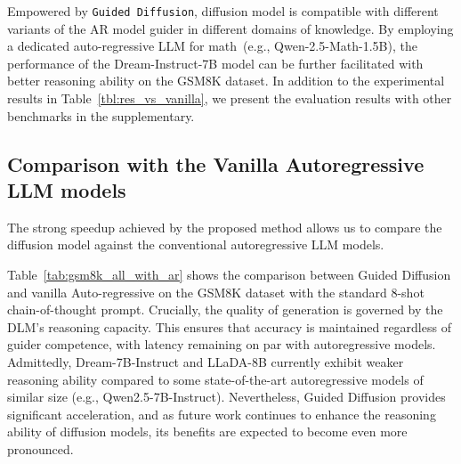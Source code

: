 Empowered by \texttt{Guided Diffusion}, diffusion model is compatible with different variants of the AR model guider in different domains of knowledge. By employing a dedicated auto-regressive LLM for math~(e.g., Qwen-2.5-Math-1.5B), the performance of the Dream-Instruct-7B model can be further facilitated with better reasoning ability on the GSM8K dataset. 
In addition to the experimental results in Table~\ref{tbl:res_vs_vanilla}, we present the evaluation results with other benchmarks in the supplementary. 

\subsection{Comparison with the Vanilla Autoregressive LLM models}
The strong speedup achieved by the proposed method allows us to compare the diffusion model against the conventional autoregressive LLM models. 

Table~\ref{tab:gsm8k_all_with_ar} shows the  comparison between Guided Diffusion and vanilla Auto-regressive on the GSM8K dataset with the standard 8-shot chain-of-thought prompt. 
Crucially, the quality of generation is governed by the DLM’s reasoning capacity. This ensures that accuracy is maintained regardless of guider competence, with latency remaining on par with autoregressive models. Admittedly, Dream-7B-Instruct and LLaDA-8B currently exhibit weaker reasoning ability compared to some state-of-the-art autoregressive models of similar size (e.g., Qwen2.5-7B-Instruct). Nevertheless, Guided Diffusion provides significant acceleration, and as future work continues to enhance the reasoning ability of diffusion models, its benefits are expected to become even more pronounced.

